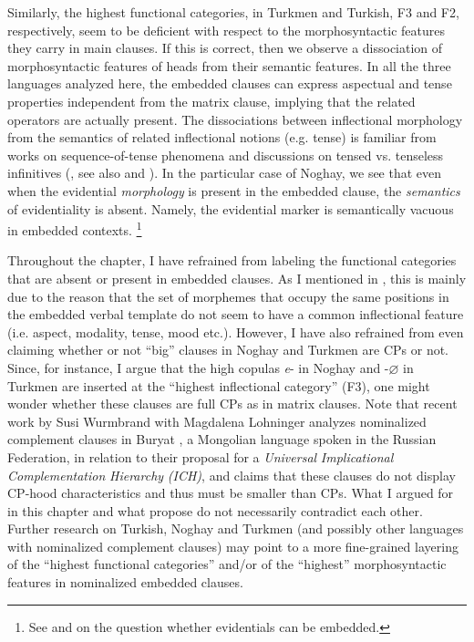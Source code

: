 \documentclass[output=paper]{langsci/langscibook}
\begin{document}
Similarly, the highest functional categories, in Turkmen and Turkish, F3 and F2, respectively, seem to be deficient with respect to the morphosyntactic features they carry in main clauses. 
If this is correct, then we observe a dissociation of morphosyntactic features of heads from their semantic features. 
In all the three languages analyzed here, the embedded clauses can express aspectual and tense properties independent from the matrix clause, implying that the related operators are actually present. 
The dissociations between inflectional morphology from the semantics of related inflectional notions (e.g. tense) is familiar from works on sequence-of-tense phenomena and discussions on tensed vs. tenseless infinitives (\citealp{Stowell1982,Wurmbrand2014}, see also \citealp{Enc1987} and \citealp{Ogihara1996}). 
In the particular case of Noghay, we see that even when the evidential \textit{morphology} is present in the embedded clause, the \textit{semantics} of evidentiality is absent. 
Namely, the evidential marker is semantically vacuous in embedded contexts.%
    \footnote{%
        See \citet{Aikhenvald2004} and \citet{SchennerSauerland2007} on the question whether evidentials can be embedded.
    }

Throughout the chapter, I have refrained from labeling the functional categories that are absent or present in embedded clauses. 
As I mentioned in , this is mainly due to the reason that the set of morphemes that occupy the same positions in the embedded verbal template do not seem to have a common inflectional feature (i.e. aspect, modality, tense, mood etc.). 
However, I have also refrained from even claiming whether or not ``big'' clauses in Noghay and Turkmen are CPs or not. 
Since, for instance, I argue that the high copulas \textit{e}{}- in Noghay and -\textit{$\varnothing$} in Turkmen are inserted at the ``highest inflectional category'' (F3), one might wonder whether these clauses are full CPs as in matrix clauses. 
Note that recent work by Susi Wurmbrand with Magdalena Lohninger \citep{WurmbrandLohninger2019} analyzes nominalized complement clauses in Buryat \citep{Bondarenko2018}, a Mongolian language spoken in the Russian Federation, in relation to their proposal for a \textit{Universal} \textit{Implicational} \textit{Complementation} \textit{Hierarchy} \textit{(ICH)}, and claims that these clauses do not display CP-hood characteristics and thus must be smaller than CPs. 
What I argued for in this chapter and what \citet{WurmbrandLohninger2019} propose do not necessarily contradict each other. 
Further research on Turkish, Noghay and Turkmen (and possibly other languages with nominalized complement clauses) may point to a more fine-grained layering of the ``highest functional categories'' and/or of the ``highest'' morphosyntactic features in nominalized embedded clauses.
\end{document}
